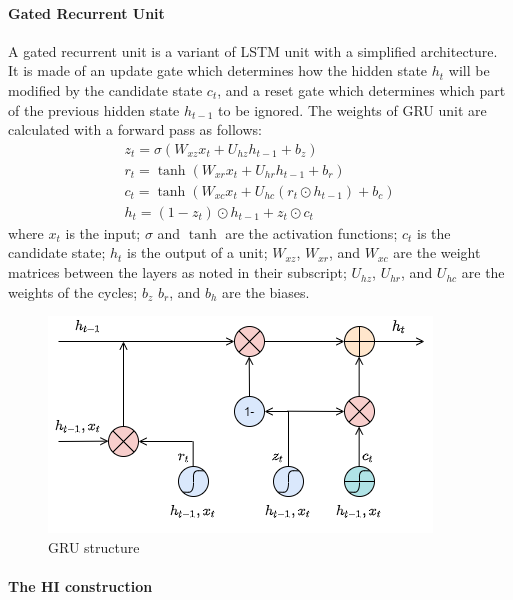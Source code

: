 \paragraph{Gated Recurrent Unit}
A gated recurrent unit is a variant of LSTM unit with a simplified architecture. It is made of an update gate which determines how
the hidden state $h_t$ will be modified by the candidate state $c_t$, and a reset gate which determines which part of the previous hidden
state $h_{t-1}$ to be ignored. The weights of GRU unit are calculated with a forward pass as follows:
\begin{equation}
    \begin{aligned}
        z_t = \sigma(W_{xz}x_t+U_{hz}h_{t-1}+b_z)             \\
        r_t = \tanh(W_{xr}x_t+U_{hr}h_{t-1}+b_r)              \\
        c_t = \tanh(W_{xc}x_t +U_{hc}(r_t \odot h_{t-1})+b_c) \\
        h_t = (1-z_t) \odot h_{t-1} + z_t \odot c_t
    \end{aligned}
\end{equation}
where $x_t$ is the input; $\sigma$ and $\tanh$ are the activation functions; $c_t$ is the candidate state; $h_t$ is the output of a unit;
$W_{xz}$, $W_{xr}$, and $W_{xc}$ are the weight matrices between the layers as noted in their subscript; $U_{hz}$, $U_{hr}$, and $U_{hc}$
are the weights of the cycles; $b_z$ $b_r$, and $b_h$ are the biases.

\begin{figure}[ht]
    \centering
    \includegraphics[scale=0.7]{gfx/GRU_unit}
    \captionsetup{justification=centering}
    \caption{GRU structure \cite{LSTMandGRU}}
    \label{fig:GRU_unit}
\end{figure}

\paragraph{The HI construction}

